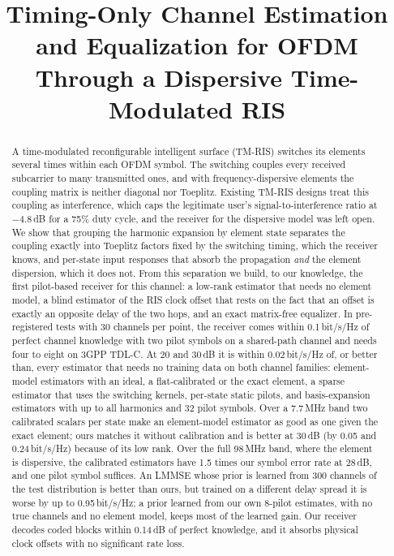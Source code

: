\documentclass[conference,10pt]{IEEEtran}
\theoremstyle{remark}
\begin{document}
\title{Timing-Only Channel Estimation and Equalization for OFDM Through a Dispersive Time-Modulated RIS}

\author{
}

\maketitle

\begin{abstract}
A time-modulated reconfigurable intelligent surface (TM-RIS) switches its elements several times within each OFDM
symbol. The switching couples every received subcarrier to many transmitted ones, and with frequency-dispersive
elements the coupling matrix is neither diagonal nor Toeplitz. Existing TM-RIS designs treat this coupling as
interference, which caps the legitimate user's signal-to-interference ratio at $-4.8$\,dB for a 75\% duty cycle,
and the receiver for the dispersive model was left open. We show that grouping the harmonic expansion by element
state separates the coupling exactly into Toeplitz factors fixed by the switching timing, which the receiver knows,
and per-state input responses that absorb the propagation \emph{and} the element dispersion, which it does not.
From this separation we build, to our knowledge, the first pilot-based receiver for this channel: a low-rank
estimator that needs no element model, a blind estimator of the RIS clock offset that rests on the fact that an
offset is exactly an opposite delay of the two hops, and an exact matrix-free equalizer. In pre-registered tests
with 30 channels per point, the receiver comes within 0.1\,bit/s/Hz of perfect channel knowledge with two pilot
symbols on a shared-path channel and needs four to eight on 3GPP TDL-C. At 20 and 30\,dB it is within 0.02\,bit/s/Hz of, or better than,
every estimator that needs no training data on both channel families: element-model estimators with an ideal, a
flat-calibrated or the exact element, a sparse estimator that uses the switching kernels, per-state static pilots, and
basis-expansion estimators with up to all harmonics and 32 pilot symbols. Over a 7.7\,MHz band two calibrated scalars per
state make an element-model estimator as good as one given the exact element; ours matches it without calibration and is
better at 30\,dB (by 0.05 and 0.24\,bit/s/Hz) because of its low rank. Over the full 98\,MHz band, where the element is
dispersive, the calibrated estimators have 1.5 times our symbol error rate at 28\,dB, and one pilot symbol suffices. An LMMSE whose prior is learned
from 300 channels of the test distribution is better than ours, but trained on a different delay spread it is worse by
up to 0.95\,bit/s/Hz; a prior learned from our own 8-pilot estimates, with no true channels and no element model, keeps
most of the learned gain. Our receiver decodes coded blocks within 0.14\,dB of perfect
knowledge, and it absorbs physical clock offsets with no significant rate loss.
\end{abstract}
\end{document}
